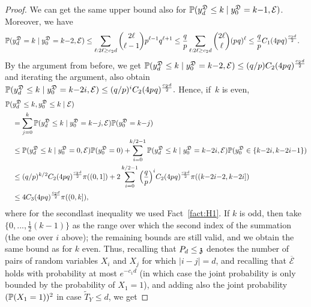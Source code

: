 \begin{proof}
We can get the same upper bound also for  $\P(\auxy_{d}^{\mathfrak{D}} \le k \mid \auxy_0^{\mathfrak{D}}=k{-}1, \mathcal{E})$. 
Moreover, 
we have
\begin{align*}
\P(\auxy_{d}^{\mathfrak{D}} = k \mid \auxy_0^{\mathfrak{D}}=k{-}2, \mathcal{E}) &\le \sum_{\ell: 2\ell \ge c_2 d} 
\binom{2\ell}{\ell-1}p_{}^{\ell{-}1}q^{\ell+1} 
\le \frac{q}{p} \sum_{\ell: 2\ell \ge c_2 d} \binom{2\ell}{\ell}(p_{}q)^{\ell} 
\le \frac{q}{p}C_1(4p_{}q)^{\frac{c_2 d}{2}}.
\end{align*}
By the argument from before,  we get
 $\P(\auxy_{d}^{\mathfrak{D}} \le k \mid \auxy_0^{\mathfrak{D}}=k{-}2, \mathcal{E}) \le (q/p)C_2 (4p_{}q)^{\frac{c_2 d}{2}}$
 and iterating the argument, also obtain
 $
 \P(\auxy_{d}^{\mathfrak{D}} \le k \mid \auxy_0^{\mathfrak{D}} = k{-}2i, \mathcal{E}) \le (q/p)^i C_2 (4p_{}q)^{\frac{c_2 d}{2}}.
 $
 Hence, if~$k$ is even, 
 \begin{align*}
 & \P(\auxy_{d}^{\mathfrak{D}} \le k, \auxy_0^{\mathfrak{D}} \le k \mid \mathcal{E}) \\
 & \quad = \sum_{j=0}^{k}\PP(\auxy_d^{\mathfrak{D}} \le k \mid \auxy_0^{\mathfrak{D}}=k{-}j, \mathcal{E})\PP(\auxy_0^{\mathfrak{D}}=k{-}j)
 \\
  & \quad \le \PP(\auxy_d^{\mathfrak{D}} \le k \mid \auxy_0^{\mathfrak{D}}=0, \mathcal{E})\PP(\auxy_0^{\mathfrak{D}}=0) 
  +\!\!\sum_{i=0}^{k/2-1}\PP(\auxy_d^{\mathfrak{D}} \le k \mid \auxy_0^{\mathfrak{D}}=k{-}2i, \mathcal{E})\PP(\auxy_0^{\mathfrak{D}} \in \{k{-}2i, k{-}2i{-}1\})
 \\
& \quad \leq (q/p)^{k/2}C_2(4pq)^{\frac{c_2d}{2}}\pi((0,1])+2\sum_{i=0}^{k/2-1}\Big(\frac{q}{p}\Big)^i C_2 (4p_{}q)^{\frac{c_2 d}{2}}\pi((k{-}2i{-}2, k{-}2i])  \\
& \quad \le 4C_3(4p_{}q)^{\frac{c_2 d}{2}}\pi((0,k]),
 \end{align*}
 where for the secondlast inequality we used Fact~\ref{fact:H1}.
If $k$ is odd, then take $\{0,...,\frac12(k-1)\}$ as the range over which the second index of the summation (the one over $i$ above); the remaining bounds are still valid, and 
we obtain the same bound as for $k$ even.
Thus, recalling that $P_d\leq\ss$ denotes the number of pairs of random variables $X_i$ and $X_j$ for which $|i-j|=d$, and recalling that $\overline{\mathcal{E}}$ holds with probability at most $e^{-c_1 d}$ (in which case the joint probability is only bounded by the probability of $X_1=1$), and adding also the joint probability $(\P(X_1=1))^2$ in case $\widetilde{T}_Y \le d$, we get %

\end{proof}

